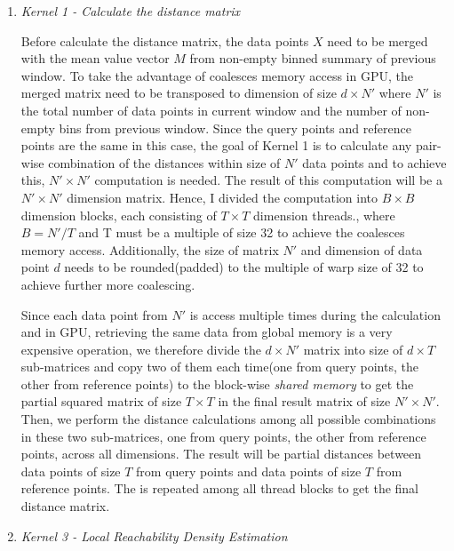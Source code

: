 \documentclass[11pt]{article}       %
\begin{document}
\break

\begin{enumerate}
	\item {\textit{Kernel 1 - Calculate the distance matrix}}
	
	Before calculate the distance matrix, the data points $X$ need to be merged with the mean value vector $M$ from non-empty binned summary of previous window. To take the advantage of coalesces memory access in GPU, the merged matrix need to be transposed to dimension of size $d \times N'$ where $N'$ is the total number of data points in current window and the number of non-empty bins from previous window. Since the query points and reference points are the same in this case, the goal of Kernel 1 is to calculate any pair-wise combination of the distances within size of $N'$ data points and to achieve this, $N' \times N'$ computation is needed. The result of this computation will be a $N' \times N'$ dimension matrix. Hence, I divided the computation into $B \times B$ dimension blocks, each consisting of $T \times T$ dimension threads., where $B = N' / T$ and T must be a multiple of size 32 to achieve the coalesces memory access. Additionally, the size of matrix $N'$ and dimension of data point $d$ needs to be rounded(padded) to the multiple of warp size of 32 to achieve further more coalescing.
	
	Since each data point from $N'$ is access multiple times during the calculation and in GPU, retrieving the same data from global memory is a very expensive operation, we therefore divide the $d \times N'$ matrix into size of $d  \times T$ sub-matrices and copy two of them each time(one from query points, the other from reference points) to the block-wise \textit{shared memory} to get the partial squared matrix of size $T \times T$ in the final result matrix of size $N' \times N'$. Then, we perform the distance calculations among all possible combinations in these two sub-matrices, one from query points, the other from reference points, across all dimensions. The result will be partial distances between data points of size $T$ from query points and data points of size $T$ from reference points. The is repeated among all thread blocks to get the final distance matrix. 
	
	\item {\textit{Kernel 3 - Local Reachability Density Estimation}}
	

\end{enumerate}
\end{document}
